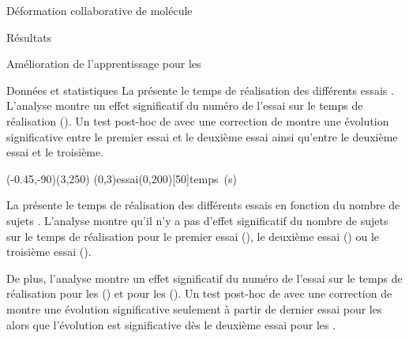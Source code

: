 \documentclass[myfrancais]{mythesis}
\begin{document}
\begin{mychapter}{Déformation collaborative de molécule}
\begin{mysection}{Résultats}
\begin{mysubsection}{Amélioration de l'apprentissage pour les }
\begin{mysubsubsection}{Données et statistiques}
					La  présente le temps de réalisation  des différents essais .
					L'analyse montre un effet significatif du numéro de l'essai  sur le temps de réalisation  ().
					Un test post-hoc de  avec une correction de  montre une évolution significative entre le premier essai et le deuxième essai ainsi qu'entre le deuxième essai et le troisième.

					\begin{myfigure}
						\begin{myps}(-0.45,-90)(3,250)
							\myaxes(0,3){essai}(0,200)[50]{temps~(s)}
						\end{myps}
					\end{myfigure}

					La  présente le temps de réalisation  des différents essais  en fonction du nombre de sujets .
					L'analyse montre qu'il n'y a pas d'effet significatif du nombre de sujets  sur le temps de réalisation  pour le premier essai (), le deuxième essai () ou le troisième essai ().

					De plus, l'analyse montre un effet significatif du numéro de l'essai  sur le temps de réalisation  pour les  () et pour les  ().
					Un test post-hoc de  avec une correction de  montre une évolution significative seulement à partir de dernier essai pour les  alors que l'évolution est significative dès le deuxième essai pour les .


\end{mysubsubsection}
\end{mysubsection}
\end{mysection}
\end{mychapter}
\end{document}
